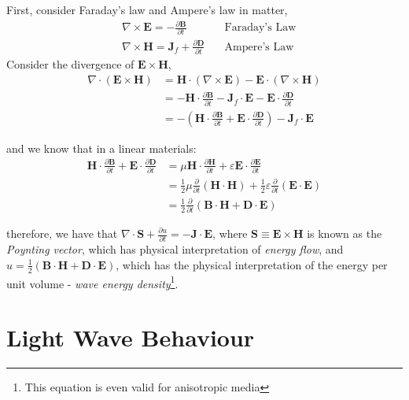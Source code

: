 \documentclass[openany]{book}
\begin{document}
First, consider Faraday's law and Ampere's law in matter,
\begin{align*}
&\nabla \times \mathbf{E}=-\frac{\partial \mathbf{B}}{\partial t}\quad &\textrm{Faraday's Law}\\
          &\nabla \times \mathbf{H}=\mathbf{J}_f+\frac{\partial \mathbf{D}}{\partial t}\quad &\textrm{Ampere's Law} 
\end{align*}
Consider the divergence of $\mathbf{E}\times \mathbf{H}$,
\begin{align*}
\nabla \cdot \left(\mathbf{E}\times \mathbf{H}\right)&=\mathbf{H}\cdot \left(\nabla \times \mathbf{E}\right)-\mathbf{E}\cdot \left(\nabla \times \mathbf{H}\right)\\
&=-\mathbf{H}\cdot \frac{\partial \mathbf{B}}{\partial t}-\mathbf{J}_f\cdot \mathbf{E}-\mathbf{E}\cdot \frac{\partial \mathbf{D}}{\partial t}\\
&=-\left(\mathbf{H}\cdot \frac{\partial \mathbf{B}}{\partial t}+\mathbf{E}\cdot \frac{\partial \mathbf{D}}{\partial t}\right)-\mathbf{J}_f\cdot \mathbf{E}
\end{align*}

and we know that in a linear materials:
\begin{align*}
\mathbf{H}\cdot \frac{\partial \mathbf{B}}{\partial t}+\mathbf{E}\cdot \frac{\partial \mathbf{D}}{\partial t}&=\mu \mathbf{H}\cdot \frac{\partial \mathbf{H}}{\partial t}+\varepsilon \mathbf{E}\cdot \frac{\partial \mathbf{E}}{\partial t}\\
&=\frac{1}{2}\mu \frac{\partial }{\partial t}\left(\mathbf{H}\cdot \mathbf{H}\right)+\frac{1}{2}\varepsilon \frac{\partial }{\partial t}\left(\mathbf{E}\cdot \mathbf{E}\right)\\
&=\frac{1}{2}\frac{\partial}{\partial t}\left(\mathbf{B}\cdot \mathbf{H}+\mathbf{D}\cdot \mathbf{E}\right)
\end{align*}

therefore, we have that $\nabla \cdot \mathbf{S}+\frac{\partial u}{\partial t}=-\mathbf{J}\cdot \mathbf{E}$,  where $\mathbf{S}\equiv \mathbf{E}\times \mathbf{H}$ is known as the \emph{Poynting vector}, which has physical interpretation of \emph{energy flow}, and $u=\frac{1}{2}\left(\mathbf{B}\cdot \mathbf{H}+\mathbf{D}\cdot \mathbf{E}\right)$, which has the physical interpretation of the energy per unit volume - \emph{wave energy density}\footnote{This equation is even valid for anisotropic media}.

\chapter{Light Wave Behaviour}
\end{document}
